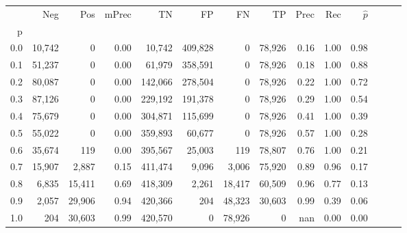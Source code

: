 \begin{tabular}{rrrrrrrrrrrrrr}
\toprule
{} &     Neg &     Pos & mPrec &       TN &       FP &      FN &      TP &  Prec &   Rec & $\hat{p}$ \\
p   &         &         &       &          &          &         &         &       &       &           \\
\midrule
0.0 &  10,742 &       0 &  0.00 &   10,742 &  409,828 &       0 &  78,926 &  0.16 &  1.00 &      0.98 \\
0.1 &  51,237 &       0 &  0.00 &   61,979 &  358,591 &       0 &  78,926 &  0.18 &  1.00 &      0.88 \\
0.2 &  80,087 &       0 &  0.00 &  142,066 &  278,504 &       0 &  78,926 &  0.22 &  1.00 &      0.72 \\
0.3 &  87,126 &       0 &  0.00 &  229,192 &  191,378 &       0 &  78,926 &  0.29 &  1.00 &      0.54 \\
0.4 &  75,679 &       0 &  0.00 &  304,871 &  115,699 &       0 &  78,926 &  0.41 &  1.00 &      0.39 \\
0.5 &  55,022 &       0 &  0.00 &  359,893 &   60,677 &       0 &  78,926 &  0.57 &  1.00 &      0.28 \\
0.6 &  35,674 &     119 &  0.00 &  395,567 &   25,003 &     119 &  78,807 &  0.76 &  1.00 &      0.21 \\
0.7 &  15,907 &   2,887 &  0.15 &  411,474 &    9,096 &   3,006 &  75,920 &  0.89 &  0.96 &      0.17 \\
0.8 &   6,835 &  15,411 &  0.69 &  418,309 &    2,261 &  18,417 &  60,509 &  0.96 &  0.77 &      0.13 \\
0.9 &   2,057 &  29,906 &  0.94 &  420,366 &      204 &  48,323 &  30,603 &  0.99 &  0.39 &      0.06 \\
1.0 &     204 &  30,603 &  0.99 &  420,570 &        0 &  78,926 &       0 &   nan &  0.00 &      0.00 \\
\bottomrule
\end{tabular}
